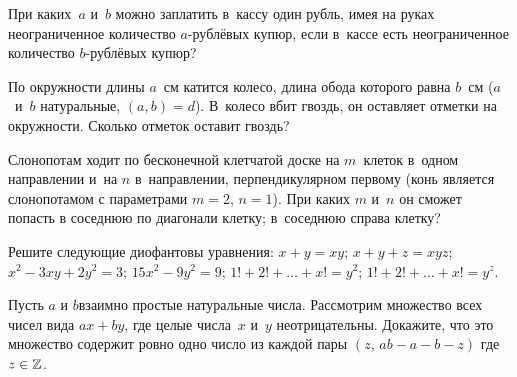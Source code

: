 \documentclass[a4paper,12pt]{article}
\begin{document}
При каких~$a$ и~$b$ можно заплатить в~кассу один рубль, имея на руках неограниченное количество $a$-рублёвых купюр, если в~кассе есть неограниченное количество $b$-рублёвых купюр?

По окружности длины $a$~см катится колесо, длина обода которого равна $b$~см ($a$~и~$b$ натуральные, $(a,b)=d$). В~колесо вбит гвоздь, он оставляет отметки на окружности. Сколько отметок оставит гвоздь?

Слонопотам ходит по бесконечной клетчатой доске на $m$~клеток в~одном направлении и~на $n$ в~направлении, перпендикулярном первому (конь является слонопотамом с параметрами $m=2$, $n=1$). При каких $m$ и~$n$ он сможет попасть
в соседнюю по диагонали клетку;
в~соседнюю справа клетку?

Решите следующие диофантовы уравнения:
$x+y=xy$;
$x+y+z=xyz$;
$x^{2}-3xy+2y^{2}=3$;
$15x^{2}-9y^{2}= 9$;
$1!+2!+\ldots+x!=y^{2}$;
$1!+2!+\ldots+x!=y^{z}$.

Пусть $a$ и $b$\т взаимно простые натуральные числа. Рассмотрим множество всех чисел вида $ax+by$, где целые числа~$x$ и~$y$ неотрицательны. Докажите, что это множество содержит ровно одно число из каждой пары $(z,\, ab-a-b-z)$ где $z\in\mathbb{Z}$.

\vfill
{}
\end{document}
